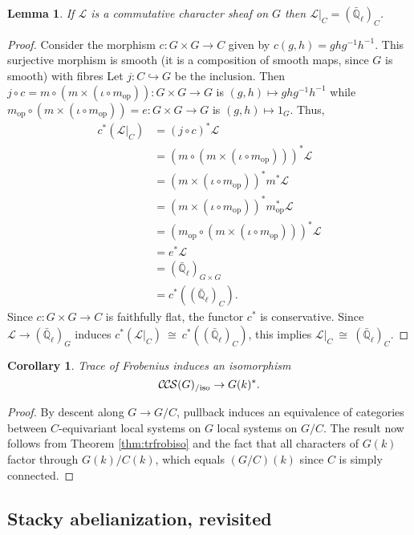\documentclass[10pt]{amsart}
\theoremstyle{plain}
\newtheorem{lemma}[theorem]{Lemma}
\newtheorem{corollary}[theorem]{Corollary}
\theoremstyle{definition}
\newcommand{\EE}{\mathbb{\bar Q}_\ell}
\newcommand{\Fq}{k}
\newcommand{\op}{_{\operatorname{op}}}
\newcommand{\iso}{{\ \cong\ }}
\newcommand{\cs}[1]{{\mathcal{#1}}}
\newcommand{\CCS}{{\mathcal{C\hskip-.8pt C\hskip-0.8pt S}}}
\newcommand{\CCSiso}[1]{\CCS(#1)_{/\text{iso}}}
\begin{document}
\begin{lemma}
If $\cs{L}$ is a commutative character sheaf on $G$ then $\cs{L}\vert_C = (\EE)_C$.
\end{lemma}
\begin{proof}
 Consider the morphism $c:  G \times G \to C$ given by $c(g,h)= ghg^{-1}h^{-1}$.
This surjective morphism is smooth (it is a composition of smooth maps, since $G$ is smooth) with fibres
Let $j : C \hookrightarrow G$ be the inclusion.  
Then $j\circ c = m\circ (m \times (\iota\circ m\op)) : G \times G \to G$ is $(g,h) \mapsto gh g^{-1}h^{-1}$ while $m\op\circ (m \times (\iota\circ m\op))= e : G \times G \to G$ is $(g,h) \mapsto 1_G$. Thus,
\begin{align*}
c^* (\cs{L}\vert_C)
&=  (j\circ c)^*\cs{L} \\
&= (m\circ (m \times (\iota\circ m\op)))^* \cs{L} \\
&= (m \times (\iota\circ m\op))^* m^* \cs{L} \\
&= (m \times (\iota\circ m\op))^* m\op^* \cs{L} \\
&= (m\op\circ (m \times (\iota\circ m\op)))^* \cs{L} \\
&= e^* \cs{L}\\
&= (\EE)_{G\times G}\\
&= c^* ((\EE)_C).
\end{align*}
Since $c : G \times G \to C$ is faithfully flat, the functor $c^*$ is conservative.
Since $\cs{L} \to (\EE)_G$ induces $c^* (\cs{L}\vert_C) \iso c^* ((\EE)_C)$, this implies $\cs{L}\vert_C \iso (\EE)_C$. 
\end{proof}


 \begin{corollary}
 Trace of Frobenius induces an isomorphism
 \[
 \CCSiso{G} \to G(\Fq)^*.
 \]
 \end{corollary}
 
 \begin{proof}
 By descent along $G \to G/C$, pullback induces an equivalence of categories between $C$-equivariant local systems on $G$ local systems on  $G/C$. 
  The result now follows from Theorem \ref{thm:trfrobiso} and the fact that all characters of $G(\Fq)$ factor through
 $G(\Fq)/C(\Fq)$, which equals $(G/C)(\Fq)$ since $C$ is simply connected.
 \end{proof}
 
\subsection{Stacky abelianization, revisited}
 
\end{document}
